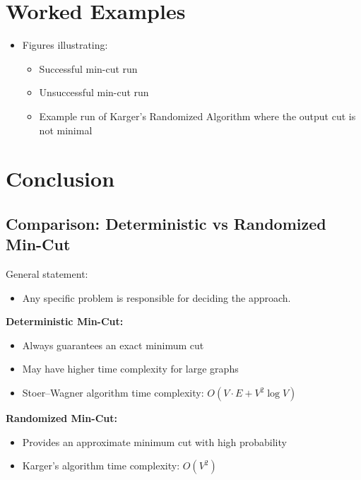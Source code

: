 \documentclass[11pt]{article}
\begin{document}
\section{Worked Examples}

\begin{itemize}
    \item Figures illustrating:
    \begin{itemize}
        \item Successful min-cut run
        \item Unsuccessful min-cut run
        \item Example run of Karger’s Randomized Algorithm where the output cut is not minimal
    \end{itemize}
\end{itemize}

\section{Conclusion}

\subsection{Comparison: Deterministic vs Randomized Min-Cut}

General statement:

\begin{itemize}
    \item Any specific problem is responsible for deciding the approach.
\end{itemize}

\textbf{Deterministic Min-Cut:}

\begin{itemize}
    \item Always guarantees an exact minimum cut
    \item May have higher time complexity for large graphs
    \item Stoer--Wagner algorithm time complexity:
    \( O(V \cdot E + V^2 \log V) \)
\end{itemize}

\textbf{Randomized Min-Cut:}

\begin{itemize}
    \item Provides an approximate minimum cut with high probability
    \item Karger’s algorithm time complexity:
    \( O(V^2) \)
\end{itemize}
\end{document}
